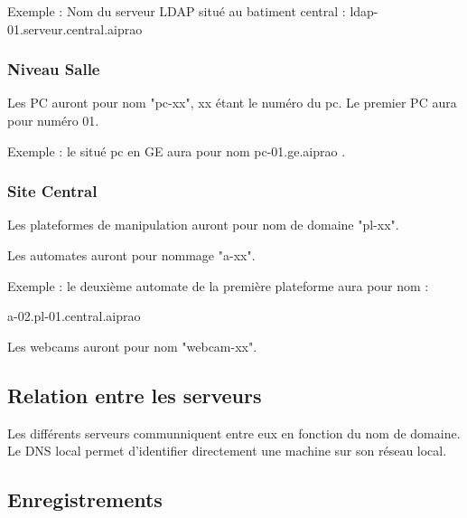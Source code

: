 Exemple : Nom du serveur LDAP situé au batiment central : ldap-01.serveur.central.aiprao

\subsubsection{Niveau Salle}

Les PC auront pour nom "pc-xx", xx étant le numéro du pc. Le premier PC aura 
pour numéro 01.

Exemple : le situé pc en GE aura pour nom pc-01.ge.aiprao .

\subsubsection{Site Central}

Les plateformes de manipulation auront pour nom de domaine "pl-xx".

Les automates auront pour nommage "a-xx". 

Exemple : le deuxième automate de la première plateforme aura pour nom : 

a-02.pl-01.central.aiprao

Les webcams auront pour nom "webcam-xx".

\subsection{Relation entre les serveurs}

Les différents serveurs communniquent entre eux en fonction du nom de domaine. 
Le DNS local permet d'identifier directement une machine sur son réseau local.


\subsection{Enregistrements}


